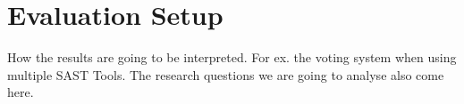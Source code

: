 \section{Evaluation Setup}
\label{sec:eval}
How the results are going to be interpreted. 
For ex. the voting system when using multiple SAST Tools.
The research questions we are going to analyse also come here.